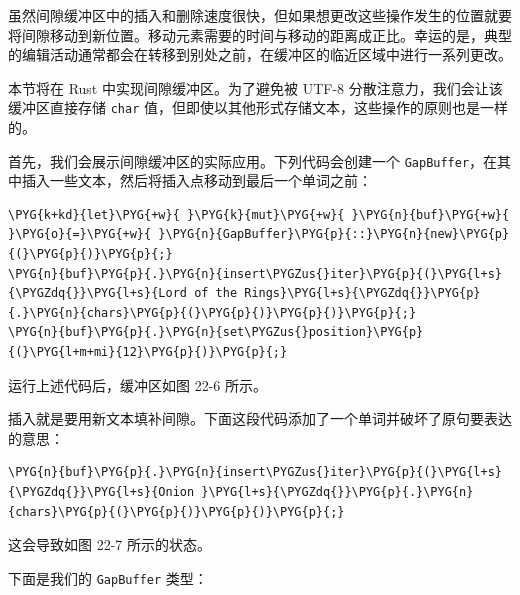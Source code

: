 虽然间隙缓冲区中的插入和删除速度很快，但如果想更改这些操作发生的位置就要将间隙移动到新位置。移动元素需要的时间与移动的距离成正比。幸运的是，典型的编辑活动通常都会在转移到别处之前，在缓冲区的临近区域中进行一系列更改。

本节将在 Rust 中实现间隙缓冲区。为了避免被 UTF-8 分散注意力，我们会让该缓冲区直接存储 \texttt{char} 值，但即使以其他形式存储文本，这些操作的原则也是一样的。

首先，我们会展示间隙缓冲区的实际应用。下列代码会创建一个 \texttt{GapBuffer}，在其中插入一些文本，然后将插入点移动到最后一个单词之前：

\begin{Verbatim}[commandchars=\\\{\},breaklines=true,breakanywhere=true,fontsize=\codefont,xleftmargin=17bp]
\PYG{k+kd}{let}\PYG{+w}{ }\PYG{k}{mut}\PYG{+w}{ }\PYG{n}{buf}\PYG{+w}{ }\PYG{o}{=}\PYG{+w}{ }\PYG{n}{GapBuffer}\PYG{p}{::}\PYG{n}{new}\PYG{p}{(}\PYG{p}{)}\PYG{p}{;}
\PYG{n}{buf}\PYG{p}{.}\PYG{n}{insert\PYGZus{}iter}\PYG{p}{(}\PYG{l+s}{\PYGZdq{}}\PYG{l+s}{Lord of the Rings}\PYG{l+s}{\PYGZdq{}}\PYG{p}{.}\PYG{n}{chars}\PYG{p}{(}\PYG{p}{)}\PYG{p}{)}\PYG{p}{;}
\PYG{n}{buf}\PYG{p}{.}\PYG{n}{set\PYGZus{}position}\PYG{p}{(}\PYG{l+m+mi}{12}\PYG{p}{)}\PYG{p}{;}
\end{Verbatim}

运行上述代码后，缓冲区如图 22-6 所示。


插入就是要用新文本填补间隙。下面这段代码添加了一个单词并破坏了原句要表达的意思：

\begin{Verbatim}[commandchars=\\\{\},breaklines=true,breakanywhere=true,fontsize=\codefont,xleftmargin=17bp]
\PYG{n}{buf}\PYG{p}{.}\PYG{n}{insert\PYGZus{}iter}\PYG{p}{(}\PYG{l+s}{\PYGZdq{}}\PYG{l+s}{Onion }\PYG{l+s}{\PYGZdq{}}\PYG{p}{.}\PYG{n}{chars}\PYG{p}{(}\PYG{p}{)}\PYG{p}{)}\PYG{p}{;}
\end{Verbatim}

这会导致如图 22-7 所示的状态。


下面是我们的 \texttt{GapBuffer} 类型：

